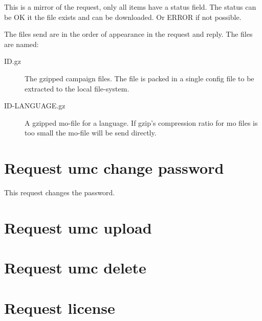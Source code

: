 This is a mirror of the request, only all items have a status field. The
status can be OK it the file exists and can be downloaded. Or ERROR if not
possible.

The files send are in the order of appearance in the request and reply. The
files are named:
\begin{description}
\item[ID.gz]
	The gzipped campaign files. The file is packed in a single config file
	to be extracted to the local file-system.

\item[ID-LANGUAGE.gz]
	A gzipped mo-file for a language. If gzip's compression ratio for mo
	files is too small the mo-file will be send directly.

\end{description}


\section{Request umc change password}
\label{wire:request_umc_change_password}

This request changes the password.


\section{Request umc upload}
\label{wire:request_umc_upload}


\section{Request umc delete}
\label{wire:request_umc_delete}

\section{Request license}
\label{wire:request_license}
